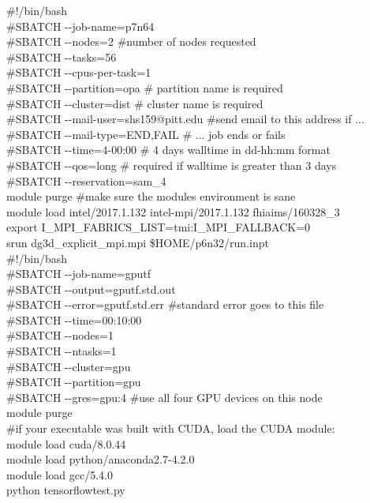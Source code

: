 \documentclass[landscape,a0paper,fontscale=0.285]{baposter} %
\begin{document}
\begin{poster}
{\colorbox[HTML]{cdb87d}{}
\#!/bin/bash\\
\#SBATCH -{}-job-name=p7n64\\
\#SBATCH -{}-nodes=2 \hfill\#number of nodes requested\\
\#SBATCH -{}-tasks=56\\
\#SBATCH -{}-cpus-per-task=1\\
\#SBATCH -{}-partition=opa \hfill\# partition name is required \\
\#SBATCH -{}-cluster=dist \hfill\# cluster name is required \\
\#SBATCH -{}-mail-user=shs159@pitt.edu \hfill\#send email to this address if ...\\
\#SBATCH -{}-mail-type=END,FAIL \hfill\# ... job ends or fails\\
\#SBATCH -{}-time=4-00:00 \hfill\# 4 days walltime in dd-hh:mm format\\
\#SBATCH -{}-qos=long \hfill\# required if walltime is greater than 3 days \\
\#SBATCH -{}-reservation=sam\_4\\
module purge \hfill\#make sure the modules environment is sane \\
module load intel/2017.1.132 intel-mpi/2017.1.132 fhiaims/160328\_3\\
export I\_MPI\_FABRICS\_LIST=tmi:I\_MPI\_FALLBACK=0\\
srun dg3d\_explicit\_mpi.mpi \$HOME/p6n32/run.inpt\\

\colorbox[HTML]{cdb87d}{}
\#!/bin/bash \\
\#SBATCH -{}-job-name=gputf\\
\#SBATCH -{}-output=gputf.std.out\\
\#SBATCH -{}-error=gputf.std.err \hfill\#standard error goes to this file\\
\#SBATCH -{}-time=00:10:00\\
\#SBATCH -{}-nodes=1\\
\#SBATCH -{}-ntasks=1\\
\#SBATCH -{}-cluster=gpu\\             
\#SBATCH -{}-partition=gpu\\             
\#SBATCH -{}-gres=gpu:4 \hfill\#use all four GPU devices on this node\\
module purge\\
\#if your executable was built with CUDA, load the CUDA module:\\
module load cuda/8.0.44\\
module load python/anaconda2.7-4.2.0\\
module load gcc/5.4.0\\
python tensorflowtest.py
}


\end{poster}
\end{document}
